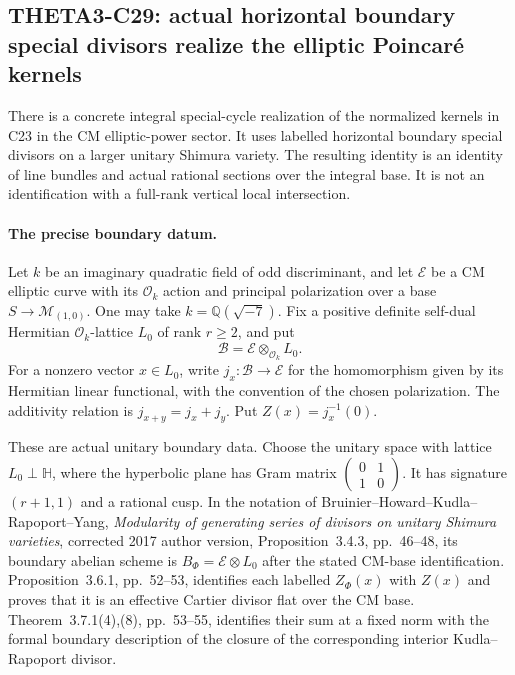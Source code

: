 \documentclass[11pt]{article}
\newcommand{\Q}{\mathbb Q}\newcommand{\C}{\mathbb C}\newcommand{\Z}{\mathbb Z}\newcommand{\R}{\mathbb R}\newcommand{\A}{\mathbb A}\newcommand{\OO}{\mathcal O}
\theoremstyle{definition}\newtheorem{definition}[theorem]{Definition}\newtheorem{remark}[theorem]{Remark}
\begin{document}
\subsection{THETA3-C29: actual horizontal boundary special divisors realize the elliptic Poincar\'e kernels}\label{C29}

There is a concrete integral special-cycle realization of the
normalized kernels in C23 in the CM elliptic-power sector.
It uses labelled horizontal boundary special divisors on a
larger unitary Shimura variety. The resulting identity is an
identity of line bundles and actual rational sections over
the integral base. It is not an identification with a
full-rank vertical local intersection.

\paragraph{The precise boundary datum.}
Let $k$ be an imaginary quadratic field of odd discriminant,
and let $\mathcal E$ be a CM elliptic curve with its
$\mathcal O_k$ action and principal polarization over a
base $S\to\mathcal M_{(1,0)}$. One may take
$k=\Q(\sqrt{-7})$. Fix a positive definite self-dual
Hermitian $\mathcal O_k$-lattice $L_0$ of rank $r\geq2$,
and put
\[
                  \mathcal B=\mathcal E\otimes_{\mathcal O_k}L_0.
\]
For a nonzero vector $x\in L_0$, write
$j_x:\mathcal B\to\mathcal E$ for the homomorphism
given by its Hermitian linear functional, with the convention
of the chosen polarization. The additivity relation is
$j_{x+y}=j_x+j_y$. Put $Z(x)=j_x^{-1}(0)$.

These are actual unitary boundary data. Choose the unitary
space with lattice $L_0\perp\mathbb H$, where the
hyperbolic plane has Gram matrix
$\left(\begin{smallmatrix}0&1\\1&0\end{smallmatrix}\right)$.
It has signature $(r+1,1)$ and a rational cusp. In the
notation of Bruinier--Howard--Kudla--Rapoport--Yang,
\emph{Modularity of generating series of divisors on unitary
Shimura varieties}, corrected 2017 author version,
Proposition~3.4.3, pp.~46--48, its boundary abelian scheme
is $B_\Phi=\mathcal E\otimes L_0$ after the stated
CM-base identification. Proposition~3.6.1, pp.~52--53,
identifies each labelled $Z_\Phi(x)$ with $Z(x)$ and
proves that it is an effective Cartier divisor flat over
the CM base. Theorem~3.7.1(4),(8), pp.~53--55,
identifies their sum at a fixed norm with the formal
boundary description of the closure of the corresponding
interior Kudla--Rapoport divisor.
\end{document}
